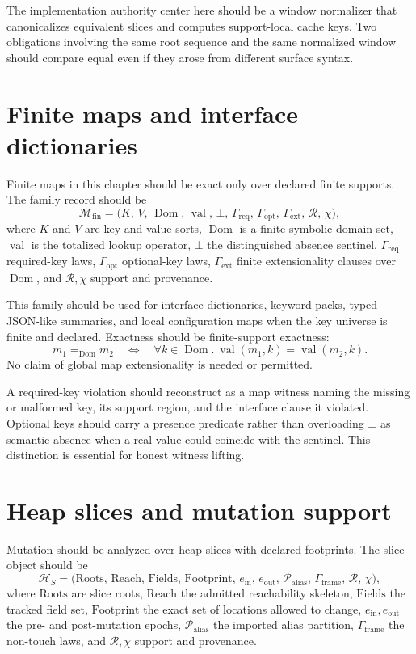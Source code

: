 \documentclass[11pt]{report}
\begin{document}
The implementation authority center here should be a window normalizer that canonicalizes equivalent slices and computes support-local cache keys. Two obligations involving the same root sequence and the same normalized window should compare equal even if they arose from different surface syntax.
\section{Finite maps and interface dictionaries}
Finite maps in this chapter should be exact only over declared finite supports. The family record should be
\[
\mathcal{M}_{\mathrm{fin}}
=
\bigl(
K,\,
V,\,
\operatorname{Dom},\,
\operatorname{val},\,
\bot,\,
\Gamma_{\mathrm{req}},\,
\Gamma_{\mathrm{opt}},\,
\Gamma_{\mathrm{ext}},\,
\mathcal{R},\,
\chi
\bigr),
\]
where $K$ and $V$ are key and value sorts, $\operatorname{Dom}$ is a finite symbolic domain set, $\operatorname{val}$ is the totalized lookup operator, $\bot$ the distinguished absence sentinel, $\Gamma_{\mathrm{req}}$ required-key laws, $\Gamma_{\mathrm{opt}}$ optional-key laws, $\Gamma_{\mathrm{ext}}$ finite extensionality clauses over $\operatorname{Dom}$, and $\mathcal{R},\chi$ support and provenance.

This family should be used for interface dictionaries, keyword packs, typed JSON-like summaries, and local configuration maps when the key universe is finite and declared. Exactness should be finite-support exactness:
\[
m_1 =_{\operatorname{Dom}} m_2
\quad \Longleftrightarrow \quad
\forall k \in \operatorname{Dom}.\ \operatorname{val}(m_1,k)=\operatorname{val}(m_2,k).
\]
No claim of global map extensionality is needed or permitted.

A required-key violation should reconstruct as a map witness naming the missing or malformed key, its support region, and the interface clause it violated. Optional keys should carry a presence predicate rather than overloading $\bot$ as semantic absence when a real value could coincide with the sentinel. This distinction is essential for honest witness lifting.
\section{Heap slices and mutation support}
Mutation should be analyzed over heap slices with declared footprints. The slice object should be
\[
\mathcal{H}_{S}
=
\bigl(
\mathrm{Roots},\,
\mathrm{Reach},\,
\mathrm{Fields},\,
\mathrm{Footprint},\,
e_{\mathrm{in}},\,
e_{\mathrm{out}},\,
\mathcal{P}_{\mathrm{alias}},\,
\Gamma_{\mathrm{frame}},\,
\mathcal{R},\,
\chi
\bigr),
\]
where $\mathrm{Roots}$ are slice roots, $\mathrm{Reach}$ the admitted reachability skeleton, $\mathrm{Fields}$ the tracked field set, $\mathrm{Footprint}$ the exact set of locations allowed to change, $e_{\mathrm{in}}, e_{\mathrm{out}}$ the pre- and post-mutation epochs, $\mathcal{P}_{\mathrm{alias}}$ the imported alias partition, $\Gamma_{\mathrm{frame}}$ the non-touch laws, and $\mathcal{R},\chi$ support and provenance.
\end{document}
